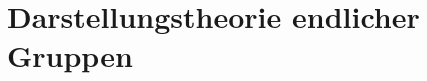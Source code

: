 \section{Darstellungstheorie endlicher Gruppen} %
\label{sec:4}



\cleardoubleoddemptypage
{}
\setcounter{page}{1}
\printindex
\listoffigures


